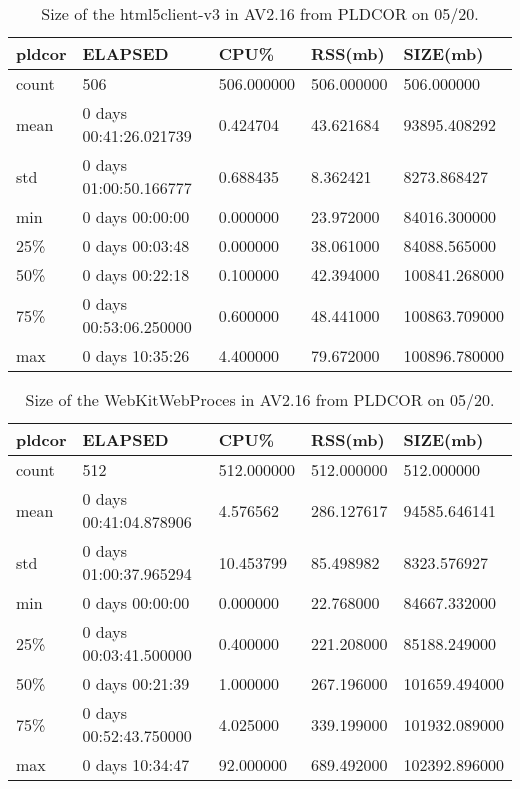 \documentclass{article}
\begin{document}
\begin{table}[H]
\begin{tabular}{|l|l|l|l|l|}
\hline pldcor &                      ELAPSED &       CPU\% &    RSS(mb) &      SIZE(mb)\\
\hline count &                    506 & 506.000000 & 506.000000  &   506.000000\\
\hline mean &  0 days 00:41:26.021739  &  0.424704 &  43.621684 &  93895.408292\\
\hline std  &  0 days 01:00:50.166777  &  0.688435 &   8.362421 &   8273.868427\\
\hline min   &        0 days 00:00:00  &  0.000000 &  23.972000 &  84016.300000\\
\hline 25\%  &         0 days 00:03:48 &   0.000000 &  38.061000 &  84088.565000\\
\hline 50\%  &         0 days 00:22:18  &  0.100000 &  42.394000 & 100841.268000\\
\hline 75\%  &  0 days 00:53:06.250000 &   0.600000 &  48.441000 & 100863.709000\\
\hline max   &        0 days 10:35:26  &  4.400000 &  79.672000 & 100896.780000\\
\hline 
\end{tabular}
\caption{\label{TABLE-AV216html5}Size of the html5client-v3 in AV2.16 from PLDCOR on 05/20.} 
\end{table}



\begin{table}[H]
\begin{tabular}{|l|l|l|l|l|}
\hline pldcor &                      ELAPSED   &      CPU\%  &    RSS(mb)   &     SIZE(mb)\\
\hline count  &                    512 &  512.000000 &  512.000000  &    512.000000\\
\hline mean  &  0 days 00:41:04.878906 &    4.576562 &  286.127617 &   94585.646141\\
\hline std   &  0 days 01:00:37.965294 &   10.453799 &   85.498982  &   8323.576927\\
\hline min  &          0 days 00:00:00 &    0.000000 &   22.768000 &   84667.332000\\
\hline 25\%  &   0 days 00:03:41.500000 &    0.400000 &  221.208000 &   85188.249000\\
\hline 50\% &           0 days 00:21:39 &    1.000000 &  267.196000 &  101659.494000\\
\hline 75\%  &   0 days 00:52:43.750000 &    4.025000 &  339.199000 &  101932.089000\\
\hline max   &         0 days 10:34:47  &  92.000000 &  689.492000 &  102392.896000\\
\hline
\end{tabular}
\caption{\label{TABLE-AV216WebKitWeb}Size of the WebKitWebProces in AV2.16 from PLDCOR on 05/20.} 
\end{table}
\end{document}

